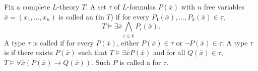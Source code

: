 Fix a complete $L$-theory $T$. A set $\tau$ of $L$-formulas $P(\bar{x})$ with $n$ free variables $\bar{x} = (x_1, \ldots, x_n)$ is called an  (in $T$) if for every $P_1(\bar{x}), \ldots, P_k(\bar{x}) \in \tau$,
$$T \vDash \exists \bar{x} \bigwedge_{i \leq k} P_i(\bar{x}).$$
A type $\tau$ is called  if for every $P(\bar{x})$, either $P(\bar{x}) \in \tau$ or $\neg P(\bar{x}) \in \tau$. A type $\tau$ is  if there exists $P(\bar{x})$ such that $T \vDash \exists \bar{x} P(\bar{x})$ and for all $Q(\bar{x}) \in \tau$, $T \vDash \forall \bar{x}(P(\bar{x}) \rightarrow Q(\bar{x}))$. Such $P$ is called a  for $\tau$.
